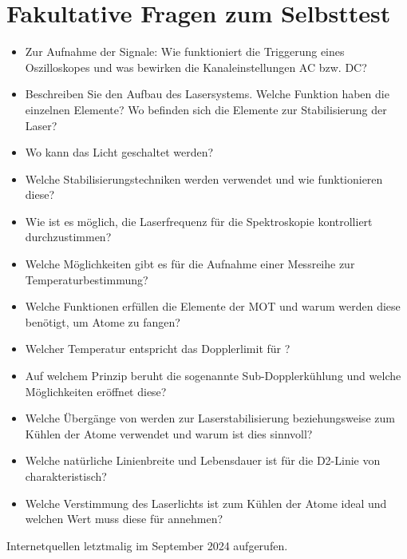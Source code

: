 \documentclass[
class=book,
accentcolor=1b,
custommargins=geometry,
fontsize=11pt,
thesis={type=Versuchsanleitung},
ruledheaders=all,
headline=false,
instbox=false,
marginpar=false,
title=small,
ignore-missing-data=true,
twoside=false,
logofile=apqdesign/tuda_logo.pdf,
pdfa=false %
]{apqpub}
\begin{document}
					\section{Fakultative Fragen zum Selbsttest}
					\begin{itemize}
						\item Zur Aufnahme der Signale: Wie funktioniert die Triggerung eines Oszilloskopes und was bewirken die Kanaleinstellungen AC bzw. DC? 
						\item Beschreiben Sie den Aufbau des Lasersystems. Welche Funktion haben die einzelnen Elemente? Wo befinden sich die Elemente zur Stabilisierung der Laser? 
						\item Wo kann das Licht geschaltet werden?				
						\item Welche Stabilisierungstechniken werden verwendet und wie funktionieren diese?
						\item Wie ist es möglich, die Laserfrequenz für die Spektroskopie kontrolliert durchzustimmen?
						\item Welche Möglichkeiten gibt es für die Aufnahme einer Messreihe zur Temperaturbestimmung?
						\item Welche Funktionen erfüllen die Elemente der MOT und warum werden diese benötigt, um Atome zu fangen?
						\item Welcher Temperatur entspricht das Dopplerlimit für ?
						\item Auf welchem Prinzip beruht die sogenannte Sub-Dopplerkühlung und welche Möglichkeiten eröffnet diese?
						\item Welche Übergänge von  werden zur Laserstabilisierung beziehungsweise zum Kühlen der Atome verwendet und warum ist dies sinnvoll?
						\item Welche natürliche Linienbreite und Lebensdauer ist für die D2-Linie von  charakteristisch?
						\item Welche Verstimmung des Laserlichts ist zum Kühlen der Atome ideal und welchen Wert muss diese für  annehmen?
					\end{itemize}
\newpage
\appendix	
\printbibliography
Internetquellen letztmalig im September 2024 aufgerufen.		
					
								
\end{document}

